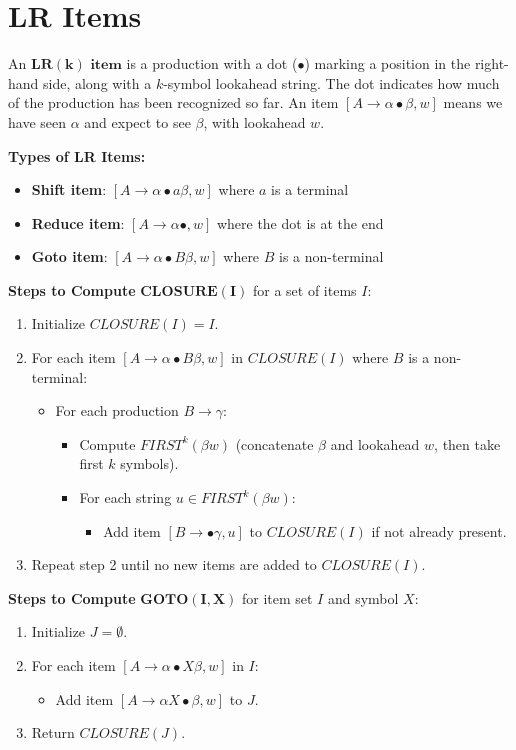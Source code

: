 \section{LR Items}

An $\mathbf{LR(k) \text{ item}}$ is a production with a dot ($\bullet$) marking a position in the right-hand side, along with a $k$-symbol lookahead string. The dot indicates how much of the production has been recognized so far. An item $[A \to \alpha \bullet \beta, w]$ means we have seen $\alpha$ and expect to see $\beta$, with lookahead $w$.

\textbf{Types of LR Items:}
\begin{itemize}
\item \textbf{Shift item}: $[A \to \alpha \bullet a \beta, w]$ where $a$ is a terminal
\item \textbf{Reduce item}: $[A \to \alpha \bullet, w]$ where the dot is at the end
\item \textbf{Goto item}: $[A \to \alpha \bullet B \beta, w]$ where $B$ is a non-terminal
\end{itemize}

\textbf{Steps to Compute} $\mathbf{CLOSURE(I)}$ for a set of items $I$:
\begin{enumerate}
\item Initialize $CLOSURE(I) = I$.
\item For each item $[A \to \alpha \bullet B \beta, w]$ in $CLOSURE(I)$ where $B$ is a non-terminal:
   \begin{itemize}
   \item For each production $B \to \gamma$:
     \begin{itemize}
     \item Compute $FIRST^k(\beta w)$ (concatenate $\beta$ and lookahead $w$, then take first $k$ symbols).
     \item For each string $u \in FIRST^k(\beta w)$:
       \begin{itemize}
       \item Add item $[B \to \bullet \gamma, u]$ to $CLOSURE(I)$ if not already present.
       \end{itemize}
     \end{itemize}
   \end{itemize}
\item Repeat step 2 until no new items are added to $CLOSURE(I)$.
\end{enumerate}

\textbf{Steps to Compute} $\mathbf{GOTO(I, X)}$ for item set $I$ and symbol $X$:
\begin{enumerate}
\item Initialize $J = \emptyset$.
\item For each item $[A \to \alpha \bullet X \beta, w]$ in $I$:
   \begin{itemize}
   \item Add item $[A \to \alpha X \bullet \beta, w]$ to $J$.
   \end{itemize}
\item Return $CLOSURE(J)$.
\end{enumerate}


